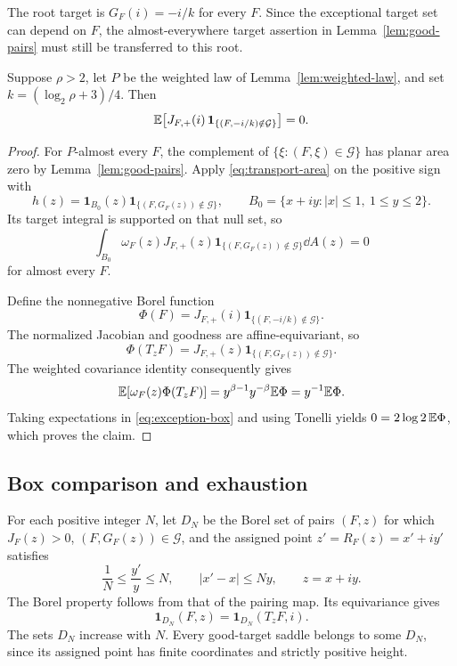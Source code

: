 The root target is $G_F(i)=-i/k$ for every $F$.  Since the exceptional
target set can depend on $F$, the almost-everywhere target assertion
in Lemma~\ref{lem:good-pairs} must still be transferred to this root.

\begin{lemma}\label{lem:root-exception}
 Suppose $\rho>2$, let $P$ be the weighted law of
 Lemma~\ref{lem:weighted-law}, and set
 $k=(\log_2\rho+3)/4$.  Then
 \begin{equation}\label{eq:root-exception}
  \mathbb E\!\left[
   J_{F,+}(i)\,
   \mathbf 1_{\{(F,-i/k)\notin\mathcal G\}}
  \right]=0.
 \end{equation}
\end{lemma}

\begin{proof}
 For $P$-almost every $F$, the complement of
 $\{\xi:(F,\xi)\in\mathcal G\}$ has planar area zero by
 Lemma~\ref{lem:good-pairs}.  Apply \eqref{eq:transport-area} on the
 positive sign with
 \[
 h(z)=\mathbf 1_{B_0}(z)
       \mathbf 1_{\{(F,G_F(z))\notin\mathcal G\}},
 \qquad B_0=\{x+iy:|x|\leq1,\ 1\leq y\leq2\}.
 \]
 Its target integral is supported on that null set, so
 \begin{equation}\label{eq:exception-box}
  \int_{B_0}\omega_F(z)J_{F,+}(z)
   \mathbf 1_{\{(F,G_F(z))\notin\mathcal G\}}\dd A(z)=0
 \end{equation}
 for almost every $F$.

 Define the nonnegative Borel function
 \[
  \Phi(F)=J_{F,+}(i)
          \mathbf 1_{\{(F,-i/k)\notin\mathcal G\}}.
 \]
 The normalized Jacobian and goodness are affine-equivariant, so
 \[
  \Phi(T_zF)=J_{F,+}(z)
            \mathbf 1_{\{(F,G_F(z))\notin\mathcal G\}}.
 \]
 The weighted covariance identity consequently gives
 \[
  \mathbb E[\omega_F(z)\Phi(T_zF)]
   =y^{\beta-1}y^{-\beta}\mathbb E\Phi
   =y^{-1}\mathbb E\Phi.
 \]
 Taking expectations in \eqref{eq:exception-box} and using Tonelli
 yields $0=2\log2\,\mathbb E\Phi$, which proves the claim.
\end{proof}

\subsection{Box comparison and exhaustion}

For each positive integer $N$, let $D_N$ be the Borel set of pairs
$(F,z)$ for which $J_F(z)>0$, $(F,G_F(z))\in\mathcal G$, and the
assigned point $z'=R_F(z)=x'+iy'$ satisfies
\begin{equation}\label{eq:transport-displacement}
 \frac1N\leq\frac{y'}y\leq N,\qquad |x'-x|\leq Ny,
 \qquad z=x+iy.
\end{equation}
The Borel property follows from that of the pairing map.
Its equivariance gives
\begin{equation}\label{eq:transport-equivariance}
 \mathbf 1_{D_N}(F,z)=\mathbf 1_{D_N}(T_zF,i).
\end{equation}
The sets $D_N$ increase with $N$.  Every good-target saddle belongs
to some $D_N$, since its assigned point has finite coordinates and
strictly positive height.

